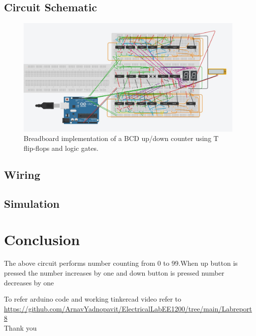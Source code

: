 \documentclass{article}
\begin{document}
    \subsection{Circuit Schematic}
    \begin{figure}[h!]
        \centering
        \includegraphics[width=\textwidth]{counter_circuit.jpeg}
        \caption{Breadboard implementation of a BCD up/down counter using T flip-flops and logic gates.}
        \label{fig:bcd_counter}
    \end{figure}
    \subsection{Wiring}
    
    \subsection{Simulation}
    \section{Conclusion}
    The above circuit performs number counting from 0 to 99.When up button is pressed the number increases by one and down button is pressed number decreases by one
    
    To refer arduino code and working tinkercad video refer to \\
    \url{https://github.com/ArnavYadnopavit/ElectricalLabEE1200/tree/main/Labreport8}\\
    
 \centering
 Thank you
    
\end{document}
